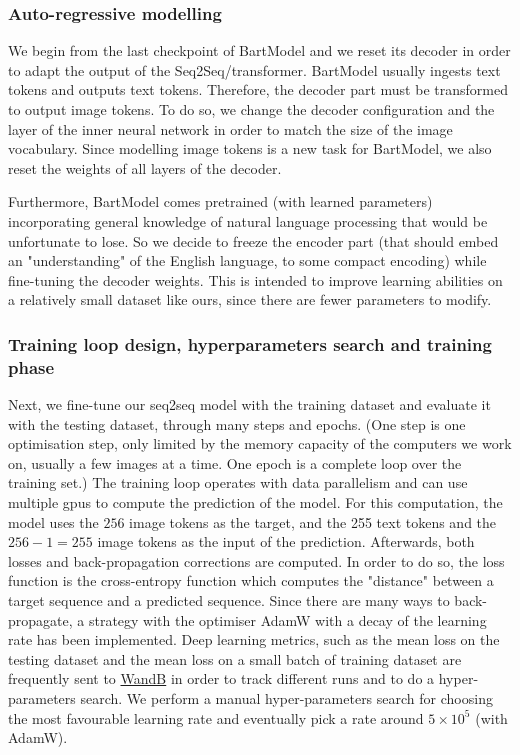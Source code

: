 \documentclass{article}
\begin{document}
\begin{multicols}{2}
\subsubsection{Auto-regressive modelling}

We begin from the last checkpoint of BartModel and we reset its decoder in order to adapt the output of the Seq2Seq/transformer. BartModel usually ingests text tokens and outputs text tokens. Therefore, the decoder part must be transformed to output image tokens. To do so, we change the decoder configuration and the layer of the inner neural network in order to match the size of the image vocabulary. Since modelling image tokens is a new task for BartModel, we also reset the weights of all layers of the decoder.

Furthermore, BartModel comes pretrained (with learned parameters) incorporating general knowledge of natural language processing that would be unfortunate to lose. So we decide to freeze the encoder part (that should embed an "understanding" of the English language, to some compact encoding) while fine-tuning the decoder weights. This is intended to improve learning abilities on a relatively small dataset like ours, since there are fewer parameters to modify.

\subsubsection{Training loop design, hyperparameters search and training phase}

Next, we fine-tune our seq2seq model with the training dataset and evaluate it with the testing dataset, through many steps and epochs. (One step is one optimisation step, only limited by the memory capacity of the computers we work on, usually a few images at a time. One epoch is a complete loop over the training set.) The training loop operates with data parallelism and can use multiple \acrshort{gpu}s to compute the prediction of the model. For this computation, the model uses the $256$ image tokens as the target, and the 255 text tokens and the $256-1=255$ image tokens as the input of the prediction.
Afterwards, both losses and back-propagation corrections are computed. In order to do so, the loss function is the cross-entropy function which computes the "distance" between a target sequence and a predicted sequence. Since there are many ways to back-propagate, a strategy with the optimiser AdamW with a decay of the learning rate has been implemented.
Deep learning metrics, such as the mean loss on the testing dataset and the mean loss on a small batch of training dataset are frequently sent to \href{https://wandb.ai/cthiounn/dalle-tiny}{WandB} in order to track different runs and to do a hyper-parameters search.
We perform a manual hyper-parameters search for choosing the most favourable learning rate and eventually pick a rate around $5\times 10^5$ (with AdamW).


\end{multicols}
\end{document}
